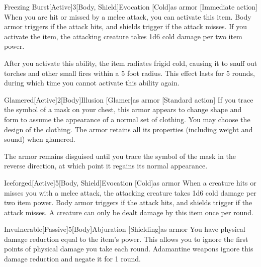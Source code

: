         \begin{magicitemdef}{Freezing Burst}[Active]{3}[Body, Shield]{Evocation [Cold]}{as armor}
            [Immediate action] When you are hit or missed by a melee attack, you can activate this item.
            Body armor triggers if the attack hits, and shields trigger if the attack misses.
            If you activate the item, the attacking creature takes 1d6 cold damage per two item power.

            After you activate this ability, the item radiates frigid cold, causing it to snuff out torches and other small fires within a 5 foot radius.
            This effect lasts for 5 rounds, during which time you cannot activate this ability again.
        \end{magicitemdef}

        \begin{magicitemdef}{Glamered}[Active]{2}[Body]{Illusion [Glamer]}{as armor}
            [Standard action] If you trace the symbol of a mask on your chest, this armor appears to change shape and form to assume the appearance of a normal set of clothing.
            You may choose the design of the clothing.
            The armor retains all its properties (including weight and sound) when glamered.

            The armor remains disguised until you trace the symbol of the mask in the reverse direction, at which point it regains its normal appearance.
        \end{magicitemdef}

        \begin{magicitemdef}{Iceforged}[Active]{5}[Body, Shield]{Evocation [Cold]}{as armor}
             When a creature hits or misses you with a melee attack, the attacking creature takes 1d6 cold damage per two item power.
            Body armor triggers if the attack hits, and shields trigger if the attack misses.
            A creature can only be dealt damage by this item once per round.
        \end{magicitemdef}

        \begin{magicitemdef}{Invulnerable}[Passive]{5}[Body]{Abjuration [Shielding]}{as armor}
             You have physical damage reduction equal to the item's power.
            This allows you to ignore the first points of physical damage you take each round.
            Adamantine weapons ignore this damage reduction and negate it for 1 round.
        \end{magicitemdef}

